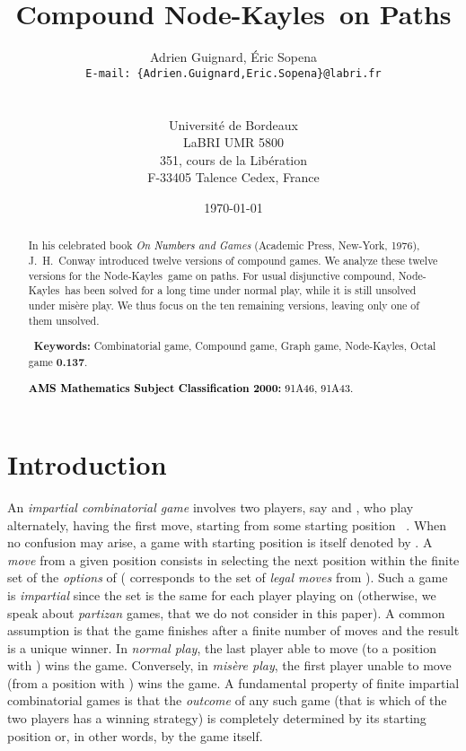 \documentclass[11pt]{article}
\newcommand{\modif}[1]{\textcolor{black}{#1}}
\newcommand{\NK}{Node-Kayles}
\newcommand{\keywords}[1]{\ \newline \noindent \textbf{Keywords: }#1}
\let\oldtitle=\title
\renewcommand{\title}[1]{\oldtitle{\Large{\textbf{#1}}}}
\newcommand{\institute}[1]{\newline \noindent
  \begin{minipage}{\textwidth}\begin{center}{\small #1}\end{center}\end{minipage}}
\newcommand{\email}[1]{{\small{\tt E-mail: #1}}}
\begin{document}
\title{Compound \NK\ on Paths}

\author{Adrien Guignard, \'Eric Sopena\\
  \email{{\small\tt \{Adrien.Guignard,Eric.Sopena\}@labri.fr}} \\ \ \\
  \institute{Universit\'e de Bordeaux \\
    LaBRI UMR 5800\\
    351, cours de la Lib\'eration \\
    F-33405 Talence Cedex, France}}

\date{\today}

\maketitle

\begin{abstract}
In his celebrated book {\em On \modif{Numbers} and Games} (Academic Press, New-York, 1976),
J.~H.~Conway introduced twelve versions of compound games. We analyze these twelve
versions for the \NK\ game on paths. For usual disjunctive compound, \NK\ has been
solved for a long time under normal play, while it is still unsolved under mis\`ere play.
We thus focus on the ten remaining versions, leaving only one of them unsolved.

\keywords{Combinatorial game, Compound game, Graph game, \NK, Octal game {\bf 0.137}.}

\noindent\modif{{\bf AMS Mathematics Subject Classification 2000:} 91A46, 91A43.}
\end{abstract}

\section{Introduction}

An {\em impartial combinatorial game} involves two players, say  and ,
who play alternately,  having the first move, starting from some
starting position ~\cite{WW,ONAG}. When no confusion may arise, a game with starting
position  is itself denoted by . A {\em move} from a given
position  consists in selecting the next position
within the finite set  of the {\em options} of 
( corresponds to the set of {\em legal moves} from ).
Such a game is {\em impartial} since the set  is the same for each player
playing on  (otherwise, we speak about {\em partizan} games, that
we do not consider in this paper).
A common assumption is that the game finishes after a finite number of
moves and the result is a unique winner.
In {\em normal play}, the last player able to move (to a position
 with ) wins the game. Conversely, in {\em mis\`ere play},
the first player unable to move (from a position
 with ) wins the game.
A fundamental property of finite impartial combinatorial games is that
the {\em outcome} of any such game (that is which of the two
players has a winning strategy)
is completely determined by its starting position or, in other
words, by the game itself.
\end{document}
